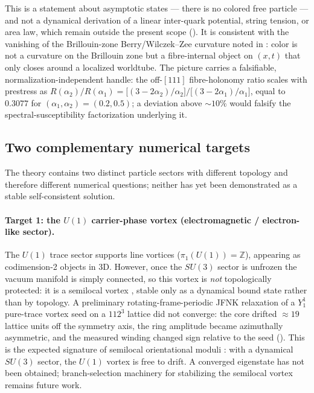 This is a statement about asymptotic states --- there is no colored free particle --- and not a
dynamical derivation of a linear inter-quark potential, string tension, or area law, which remain
outside the present scope (). It is consistent with the vanishing of the
Brillouin-zone Berry/Wilczek--Zee curvature noted in : color is not a curvature
on the Brillouin zone but a fibre-internal object on $(x,t)$ that only closes around a localized
worldtube. The picture carries a falsifiable, normalization-independent handle: the off-$[111]$
fibre-holonomy ratio scales with prestress as
$R(\alpha_2)/R(\alpha_1) = \big[(3-2\alpha_2)/\alpha_2\big]\big/\big[(3-2\alpha_1)/\alpha_1\big]$,
equal to $0.3077$ for $(\alpha_1,\alpha_2) = (0.2,0.5)$; a deviation above $\sim 10\%$ would falsify
the spectral-susceptibility factorization underlying it.

\subsection{Two complementary numerical targets}
\label{subsec:baryon-next-target}

The theory contains two distinct particle sectors with different topology and therefore different numerical
questions; neither has yet been demonstrated as a stable self-consistent solution.

\paragraph{Target 1: the $U(1)$ carrier-phase vortex (electromagnetic / electron-like sector).}
The $U(1)$ trace sector supports line vortices ($\pi_1(U(1))=\mathbb{Z}$), appearing as codimension-2 objects in 3D.
However, once the $SU(3)$ sector is unfrozen the vacuum manifold is simply connected, so this vortex is
\emph{not} topologically protected: it is a semilocal vortex \citep{VachaspatiAchucarro1991Semilocal,AchucarroVachaspati2000}, stable only as a dynamical bound state rather than by topology.
A preliminary rotating-frame-periodic JFNK relaxation of a $Y_1^1$ pure-trace vortex seed on a $112^3$ lattice did not converge: the core drifted $\approx 19$ lattice units off the symmetry axis, the ring amplitude became azimuthally asymmetric, and the measured winding changed sign relative to the seed ().
This is the expected signature of semilocal orientational moduli \citep{Eto2021OrientationalModuli}: with a dynamical $SU(3)$ sector, the $U(1)$ vortex is free to drift.
A converged eigenstate has not been obtained; branch-selection machinery for stabilizing the semilocal vortex remains future work.

